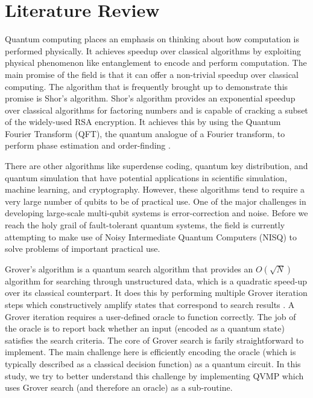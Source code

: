 \documentclass[11pt]{article}
\theoremstyle{definition}
\theoremstyle{remark}
\begin{document}
\section{Literature Review}


Quantum computing places an emphasis on thinking about how computation is
performed physically. It achieves speedup over classical algorithms by
exploiting physical phenomenon like entanglement to encode and perform
computation. The main promise of the field is that it can offer a non-trivial
speedup over classical computing. The algorithm that is frequently brought
up to demonstrate this promise is Shor’s algorithm. Shor’s
algorithm provides an exponential speedup over classical algorithms for
factoring numbers and is capable of cracking a subset of the widely-used RSA
encryption. It achieves this by using the Quantum Fourier Transform (QFT), the
quantum analogue of a Fourier transform, to perform phase estimation and
order-finding \cite{nielsen2000quantum}.

There are other algorithms like superdense coding, quantum key
distribution, and quantum simulation that have potential applications in
scientific simulation, machine learning, and cryptography. However, these
algorithms tend to require a very large number of qubits to be of practical use.
One of the major challenges in developing large-scale multi-qubit systems is
error-correction and noise. Before we reach the holy grail of  fault-tolerant
quantum systems, the field is currently attempting to make use of Noisy
Intermediate Quantum Computers (NISQ) to solve problems of important practical
use.

Grover's algorithm is a quantum search algorithm that provides an $O(\sqrt{N})$
algorithm for searching through unstructured data, which is a quadratic speed-up
over its classical counterpart. It does this by performing multiple Grover
iteration steps which constructively amplify states that correspond to search
results \cite{nielsen2000quantum}. A Grover iteration requires a user-defined
oracle to function correctly. The job of the oracle is to report back whether an
input (encoded as a quantum state) satisfies the search criteria. The core of
Grover search is farily straightforward to implement. The main challenge
here is efficiently encoding the oracle (which is typically described as
a classical decision function) as a quantum circuit. In this study, we try to
better understand this challenge by implementing QVMP which uses Grover search
(and therefore an oracle) as a sub-routine.
\end{document}
